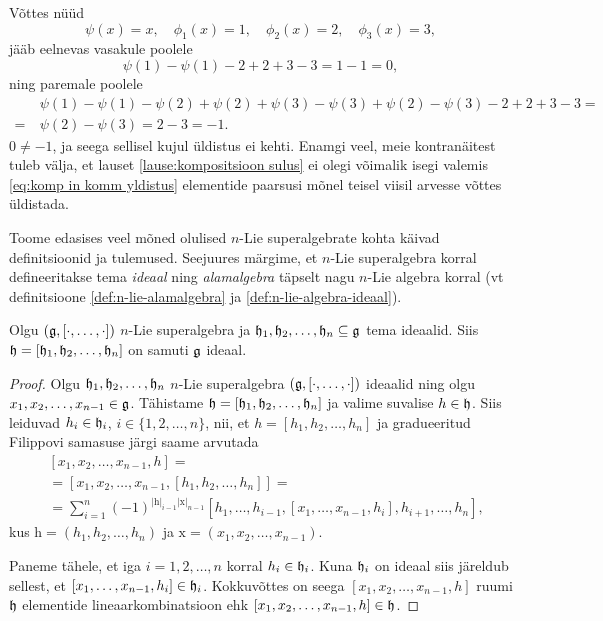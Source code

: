 \begin{markus}
    Võttes nüüd
    \[
        \psi(x) = x, \quad
        \phi_1 (x) = 1, \quad
        \phi_2 (x) = 2, \quad
        \phi_3 (x) = 3,
    \]
    jääb eelnevas vasakule poolele
    \[ \psi(1) - \psi(1) - 2 + 2 + 3 - 3 = 1 - 1 = 0, \]
    ning paremale poolele
    \begin{align*}
        &\psi(1) - \psi(1) - \psi(2) + \psi(2) + \psi(3) - \psi(3) +
            \psi(2) - \psi(3) - 2 + 2 + 3 - 3 = \\
        =\ &\psi(2) - \psi(3) = 2 - 3 = -1.
    \end{align*}
    $0 \neq -1$, ja seega sellisel kujul üldistus ei kehti.
    Enamgi veel, meie kontranäitest tuleb välja, et lauset
    \ref{lause:kompositsioon sulus} ei olegi
    võimalik isegi valemis \eqref{eq:komp in komm yldistus}
    elementide paarsusi mõnel teisel viisil arvesse võttes
    üldistada.
\end{markus}


Toome edasises veel mõned olulised $n$-Lie superalgebrate kohta
käivad definitsioonid ja tulemused. Seejuures märgime, et $n$-Lie
superalgebra korral defineeritakse tema \emph{ideaal} ning
\emph{alamalgebra} täpselt nagu $n$-Lie algebra
korral (vt definitsioone \ref{def:n-lie-alamalgebra} ja
\ref{def:n-lie-algebra-ideaal}).

\begin{lemma}
    Olgu $(\mathfrak{g}, [\cdot, \dots, \cdot])$ $n$-Lie superalgebra ja
    $\mathfrak{h}_1, \mathfrak{h}_2, \dots, \mathfrak{h}_n \subseteq \mathfrak{g}$ tema ideaalid. Siis
    $\mathfrak{h} = [\mathfrak{h}_1, \mathfrak{h}_2, \dots, \mathfrak{h}_n]$ on samuti $\mathfrak{g}$ ideaal.
\end{lemma}

\begin{proof}
    Olgu $\mathfrak{h}_1, \mathfrak{h}_2, \dots, \mathfrak{h}_n$ $n$-Lie superalgebra
    $(\mathfrak{g}, [\cdot, \dots, \cdot])$ ideaalid ning olgu
    $x_1, x_2, \dots, x_{n-1} \in \mathfrak{g}$. Tähistame
    $\mathfrak{h} = [\mathfrak{h}_1, \mathfrak{h}_2, \dots, \mathfrak{h}_n]$ ja valime suvalise $h \in \mathfrak{h}$.
    Siis leiduvad $h_i \in \mathfrak{h}_i$, $i \in \{1, 2, \dots, n\}$, nii, et
    $h = [h_1, h_2, \dots, h_n]$ ja gradueeritud Filippovi samasuse
    järgi saame arvutada
    \begin{align*}
        &[x_1, x_2, \dots, x_{n-1}, h] = \\
        &=[x_1, x_2, \dots, x_{n-1}, [h_1, h_2, \dots, h_n]] = \\
        &=\sum_{i = 1}^{n} (-1)^{|\mathrm{h}|_{i-1} |\mathrm{x}|_{n-1}}
            [h_1, \dots, h_{i-1}, [x_1, \dots, x_{n-1}, h_i],
            h_{i+1}, \dots, h_n],
    \end{align*}
    kus $\mathrm{h} = (h_1, h_2, \dots, h_n)$ ja
    $\mathrm{x} = (x_1, x_2, \dots, x_{n-1})$.

    Paneme tähele, et iga $i = 1, 2, \dots, n$ korral $h_i \in \mathfrak{h}_i$.
    Kuna $\mathfrak{h}_i$ on ideaal siis järeldub sellest, et
    $[x_1, \dots, x_{n-1}, h_i] \in \mathfrak{h}_i$. Kokkuvõttes on seega
    $[x_1, x_2, \dots, x_{n-1}, h]$ ruumi $\mathfrak{h}$ elementide lineaarkombinatsioon
    ehk $[x_1, x_2, \dots, x_{n-1}, h] \in \mathfrak{h}$.
\end{proof}

